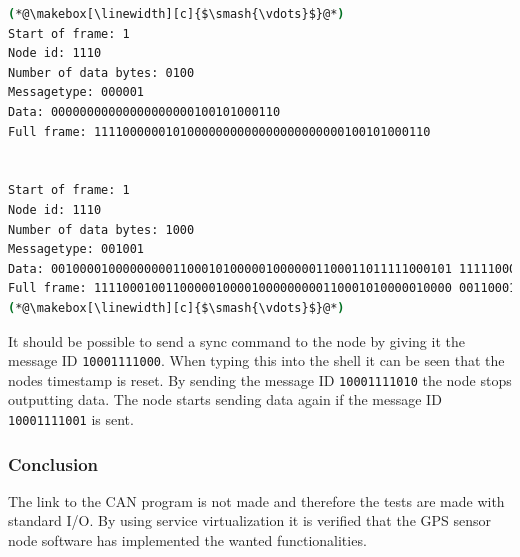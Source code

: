\begin{lstlisting}[language=bash]
(*@\makebox[\linewidth][c]{$\smash{\vdots}$}@*)
Start of frame: 1
Node id: 1110
Number of data bytes: 0100
Messagetype: 000001
Data: 00000000000000000000100101000110
Full frame: 11110000001010000000000000000000000100101000110


Start of frame: 1
Node id: 1110
Number of data bytes: 1000
Messagetype: 001001
Data: 00100001000000000110001010000010000001100011011111000101 11111000
Full frame: 11110001001100000100001000000000110001010000010000 00110001101111100010111111000
(*@\makebox[\linewidth][c]{$\smash{\vdots}$}@*)
\end{lstlisting}

It should be possible to send a sync command to the node by giving it the message ID \texttt{10001111000}.
When typing this into the shell it can be seen that the nodes timestamp is reset.
By sending the message ID \texttt{10001111010} the node stops outputting data.
The node starts sending data again if the message ID \texttt{10001111001} is sent.


\subsubsection*{Conclusion}
The link to the CAN program is not made and therefore the tests are made with standard I/O.
By using service virtualization it is verified that the GPS sensor node software has implemented the wanted functionalities.
